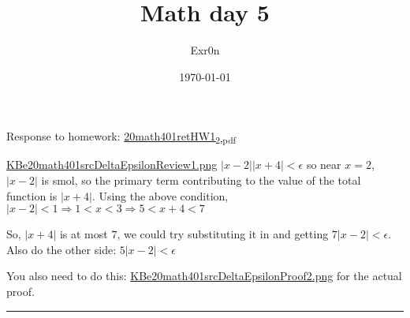 \documentclass[letterpaper]{article}
\author{Exr0n}
\date{\today}
\title{Math day 5}
\renewcommand\maketitle{}
\begin{document}
\maketitle
Response to homework:
\href{20math401retHW1\_2.pdf.org}{20math401retHW1\textsubscript{2.pdf}}

\href{KBe20math401srcDeltaEpsilonReview1.png.org}{KBe20math401srcDeltaEpsilonReview1.png}
\(|x-2||x+4| < \epsilon\) so near \(x=2\), \(|x-2|\) is smol, so the
primary term contributing to the value of the total function is
\(|x+4|\). Using the above condition,
\(|x-2| < 1 \Rightarrow 1 < x < 3 \Rightarrow 5 < x+4 < 7\)

So, \(|x+4|\) is at most \(7\), we could try substituting it in and
getting \(7|x-2| < \epsilon\). Also do the other side:
\(5|x-2| < \epsilon\)

You also need to do this:
\href{KBe20math401srcDeltaEpsilonProof2.png.org}{KBe20math401srcDeltaEpsilonProof2.png}
for the actual proof.

\noindent\rule{\textwidth}{0.5pt}
\end{document}

